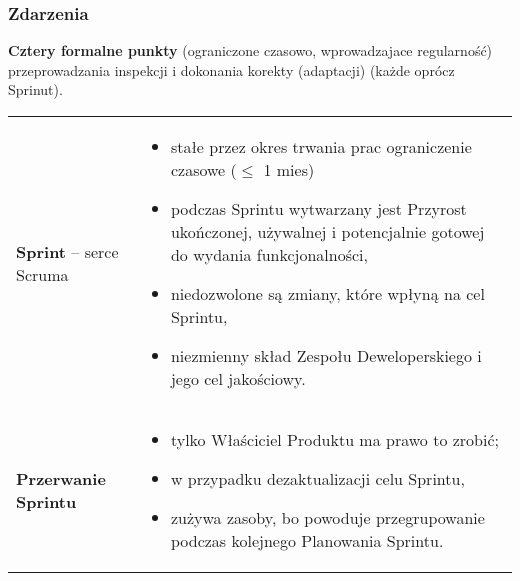 \documentclass[../main.tex]{subfiles}
\begin{document}
    \subsubsection{Zdarzenia}
    \textbf{Cztery formalne punkty} (ograniczone czasowo, wprowadzajace regularność) przeprowadzania inspekcji i dokonania korekty (adaptacji) (każde oprócz Sprinut).


    \begin{table}[H]
        \begin{center}
            \begin{tabular}{ p{} p{} }
                \textbf{Sprint} – serce Scruma
                &
                \begin{itemize}
                    \item stałe przez okres trwania prac ograniczenie czasowe ($\leq$ 1 mies)
                    \item podczas Sprintu wytwarzany jest Przyrost ukończonej,
                    używalnej i potencjalnie gotowej do wydania funkcjonalności,
                    \item niedozwolone są zmiany, które wpłyną na cel Sprintu,
                    \item niezmienny skład Zespołu Deweloperskiego i jego cel jakościowy.
                \end{itemize}
                \\

                \cmidrule(r){1-1}\cmidrule(l){2-2}
                \textbf{Przerwanie Sprintu}
                &
                \begin{itemize}
                    \item tylko Właściciel Produktu ma prawo to zrobić;
                    \item w przypadku dezaktualizacji celu Sprintu,
                    \item zużywa zasoby, bo powoduje przegrupowanie podczas kolejnego Planowania
                    Sprintu.
                \end{itemize}
                \\


\end{tabular}
\end{center}
\end{table}
\end{document}
